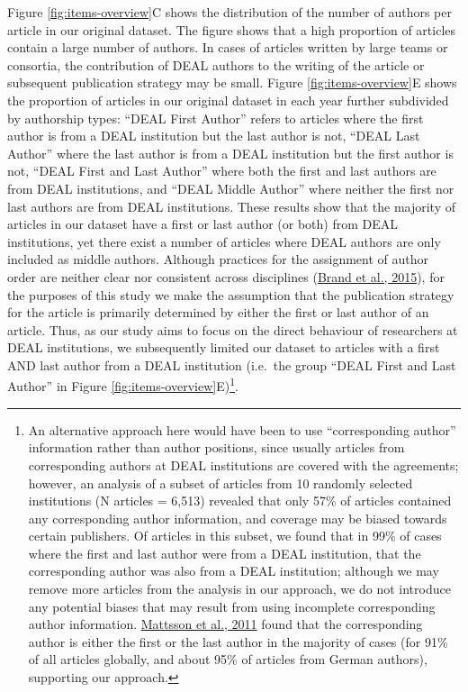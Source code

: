 \documentclass[
]{article}
\begin{document}
Figure \ref{fig:items-overview}C shows the distribution of the number of authors per article in our original dataset. The figure shows that a high proportion of articles contain a large number of authors. In cases of articles written by large teams or consortia, the contribution of DEAL authors to the writing of the article or subsequent publication strategy may be small. Figure \ref{fig:items-overview}E shows the proportion of articles in our original dataset in each year further subdivided by authorship types: ``DEAL First Author'' refers to articles where the first author is from a DEAL institution but the last author is not, ``DEAL Last Author'' where the last author is from a DEAL institution but the first author is not, ``DEAL First and Last Author'' where both the first and last authors are from DEAL institutions, and ``DEAL Middle Author'' where neither the first nor last authors are from DEAL institutions. These results show that the majority of articles in our dataset have a first or last author (or both) from DEAL institutions, yet there exist a number of articles where DEAL authors are only included as middle authors. Although practices for the assignment of author order are neither clear nor consistent across disciplines (\href{https://doi.org/10.1087/20150211}{Brand et al., 2015}), for the purposes of this study we make the assumption that the publication strategy for the article is primarily determined by either the first or last author of an article. Thus, as our study aims to focus on the direct behaviour of researchers at DEAL institutions, we subsequently limited our dataset to articles with a first AND last author from a DEAL institution (i.e.~the group ``DEAL First and Last Author'' in Figure \ref{fig:items-overview}E)\footnote{An alternative approach here would have been to use ``corresponding author'' information rather than author positions, since usually articles from corresponding authors at DEAL institutions are covered with the agreements; however, an analysis of a subset of articles from 10 randomly selected institutions (N articles = 6,513) revealed that only 57\% of articles contained any corresponding author information, and coverage may be biased towards certain publishers. Of articles in this subset, we found that in 99\% of cases where the first and last author were from a DEAL institution, that the corresponding author was also from a DEAL institution; although we may remove more articles from the analysis in our approach, we do not introduce any potential biases that may result from using incomplete corresponding author information. \href{https://doi.org/10.1007/s11192-010-0310-9}{Mattsson et al., 2011} found that the corresponding author is either the first or the last author in the majority of cases (for 91\% of all articles globally, and about 95\% of articles from German authors), supporting our approach.}.
\end{document}
